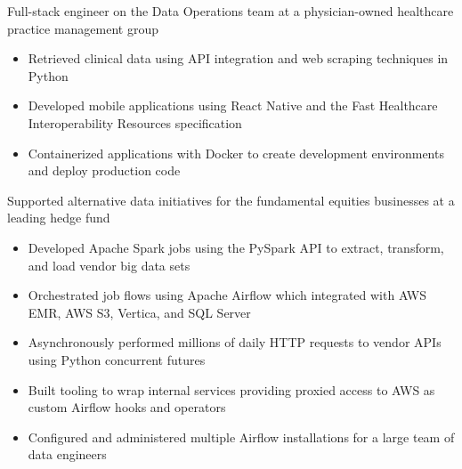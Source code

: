 \documentclass[10pt,a4paper,sans]{moderncv}        %
\begin{document}
{Full-stack engineer on the Data Operations team at a physician-owned healthcare practice management group
\begin{itemize}
	\item Retrieved clinical data using API integration and web scraping techniques in Python
	\item Developed mobile applications using React Native and the Fast Healthcare Interoperability Resources specification
	\item Containerized applications with Docker to create development environments and deploy production code
\end{itemize}}

{Supported alternative data initiatives for the fundamental equities businesses at a leading hedge fund
\begin{itemize}
	\item Developed Apache Spark jobs using the PySpark API to extract, transform, and load vendor big data sets
	\item Orchestrated job flows using Apache Airflow which integrated with AWS EMR, AWS S3, Vertica, and SQL Server
	\item Asynchronously performed millions of daily HTTP requests to vendor APIs using Python concurrent futures
	\item Built tooling to wrap internal services providing proxied access to AWS as custom Airflow hooks and operators
	\item Configured and administered multiple Airflow installations for a large team of data engineers
\end{itemize}}
\end{document}
